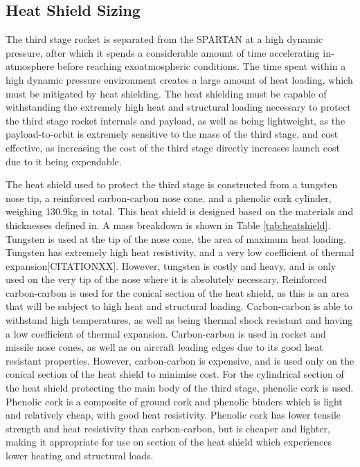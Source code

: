 \subsection{Heat Shield Sizing}

The third stage rocket is separated from the SPARTAN at a high dynamic pressure, after which it spends a considerable amount of time accelerating in-atmosphere before reaching exoatmospheric conditions. The time spent within a high dynamic pressure environment creates a large amount of heat loading, which must be mitigated by heat shielding. The heat shielding must be capable of withstanding the extremely high heat and structural loading necessary to protect the third stage rocket internals and payload, as well as being lightweight, as the payload-to-orbit is extremely sensitive to the mass of the third stage, and cost effective, as increasing the cost of the third stage directly increases launch cost due to it being expendable. 


The heat shield used to protect the third stage is constructed from a tungsten nose tip, a reinforced carbon-carbon nose cone, and a phenolic cork cylinder, weighing 130.9kg in total. This heat shield is designed based on the materials and thicknesses defined in\cite{Preller2017b}. A mass breakdown is shown in Table \ref{tab:heatshield}.
Tungsten is used at the tip of the nose cone, the area of maximum heat loading. Tungsten has extremely high heat resistivity, and a very low coefficient of thermal expansion[CITATIONXX]. However, tungsten is costly and heavy, and is only used on the very tip of the nose where it is absolutely necessary. 
  Reinforced carbon-carbon is used for the conical section of the heat shield, as this is an area that will be subject to high heat and structural loading. Carbon-carbon is able to withstand high temperatures, as well as being thermal shock resistant and having a low coefficient of thermal expansion\cite{Fitzer}. Carbon-carbon is used in rocket and missile nose cones, as well as on aircraft leading edges due to its good heat resistant properties\cite{Fitzer}. However, carbon-carbon is expensive, and is used only on the conical section of the heat shield to minimise cost. For the cylindrical section of the heat shield protecting the main body of the third stage, phenolic cork is used. Phenolic cork is a composite of ground cork and phenolic binders which is light and relatively cheap, with good heat resistivity. Phenolic cork has lower tensile strength and heat resistivity than carbon-carbon\cite{Composites,Fitzer}, but is cheaper and lighter, making it appropriate for use on section of the heat shield which experiences lower heating and structural loads. 

